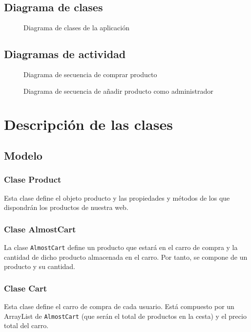 \documentclass[10pt,a4paper,svgnames]{article}
\begin{document}
\subsection{Diagrama de clases}

\begin{figure}[h] 
	\centering
	\clases
	\caption{Diagrama de clases de la aplicación}
\end{figure}

\subsection{Diagramas de actividad}

\begin{figure}[h] 
	\centering
	\comprarproducto
	\caption{Diagrama de secuencia de comprar producto}
\end{figure}

\begin{figure}[h]
	\centering
	\anadirproductoadministrador
	\caption{Diagrama de secuencia de añadir producto como administrador}
\end{figure}

\section{Descripción de las clases}
\subsection{Modelo}
\subsubsection{Clase Product}
Esta clase define el objeto producto y las propiedades y métodos de los que dispondrán los productos de nuestra web.\\
\subsubsection{Clase AlmostCart}
La clase \texttt{AlmostCart} define un producto que estará en el carro de compra y la cantidad de dicho producto almacenada en el carro. Por tanto, se compone de un producto y su cantidad.\\
\subsubsection{Clase Cart}
Esta clase define el carro de compra de cada usuario. Está compuesto por un ArrayList de \texttt{AlmostCart} (que serán el total de productos en la cesta) y el precio total del carro.\\
\end{document}
